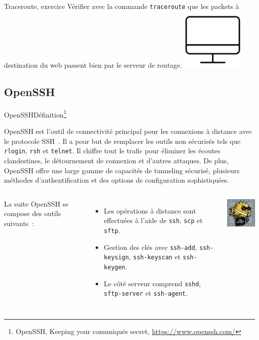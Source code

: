 \documentclass{beamer}
\begin{document}
    \begin{frame}{Traceroute, exercice \execcounterdispinc}
        Vérifier avec la commande \lstinline{traceroute} que les packets à destination du web passent bien par le serveur de routage.
        \bigbreak
        \centering
        \includegraphics[width=3cm]{image/desktop}
    \end{frame}

    \subsection{OpenSSH}\label{subsec:openssh2}

    \begin{frame}{OpenSSH}{Définition\footnote{\label{openssh-site}OpenSSH, Keeping your comuniqués secret, \url{https://www.openssh.com/}}}
        \begin{small}
            OpenSSH est l'outil de connectivité principal pour les connexions à distance avec le protocole SSH~.
            Il a pour but de remplacer les outils non sécurisés tels que \lstinline{rlogin}, \lstinline{rsh} et \lstinline{telnet}.
            Il chiffre tout le trafic pour éliminer les écoutes clandestines, le détournement de connexion et d'autres attaques.
            De plus, OpenSSH offre une large gamme de capacités de tunneling sécurisé, plusieurs méthodes d'authentification et des options de configuration sophistiquées.

            \begin{columns}
                La suite OpenSSH se compose des outils suivants~:
                \begin{itemize}
                    \item Les opérations à distance sont effectuées à l'aide de \lstinline{ssh}, \lstinline{scp} et \lstinline{sftp}.
                    \item Gestion des clés avec \lstinline{ssh-add}, \lstinline{ssh-keysign}, \lstinline{ssh-keyscan} et \lstinline{ssh-keygen}.
                    \item Le côté serveur comprend \lstinline{sshd}, \lstinline{sftp-server} et \lstinline{ssh-agent}.
                \end{itemize}
                \includegraphics[width=3cm]{image/openssh}
            \end{columns}
        \end{small}
    \end{frame}
\end{document}
